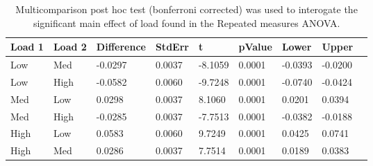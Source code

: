 \begin{table}
\centering
\begin{tabular}[0.2em]{@{}lllllllll@{}}\toprule
Load 1 & Load 2 & Difference & StdErr & t & pValue & Lower & Upper\\\toprule[0.2em]
Low & Med & -0.0297 & 0.0037 & -8.1059 & 0.0001 & -0.0393 & -0.0200 \\\midrule
Low & High & -0.0582 & 0.0060 & -9.7248 & 0.0001 & -0.0740 & -0.0424 \\\midrule
Med & Low & 0.0298 & 0.0037 & 8.1060 & 0.0001 & 0.0201 & 0.0394 \\\midrule
Med & High & -0.0285 & 0.0037 & -7.7513 & 0.0001 & -0.0382 & -0.0188 \\\midrule
High & Low & 0.0583 & 0.0060 & 9.7249 & 0.0001 & 0.0425 & 0.0741 \\\midrule
High & Med & 0.0286 & 0.0037 & 7.7514 & 0.0001 & 0.0189 & 0.0383 \\\bottomrule[0.2em]
\end{tabular}
\caption{Multicomparison post hoc test (bonferroni corrected) was used to interogate the significant main effect of load found in the Repeated measures ANOVA.\label{tabel:tbl_RMAAFC1_PH_load}}
\end{table}

